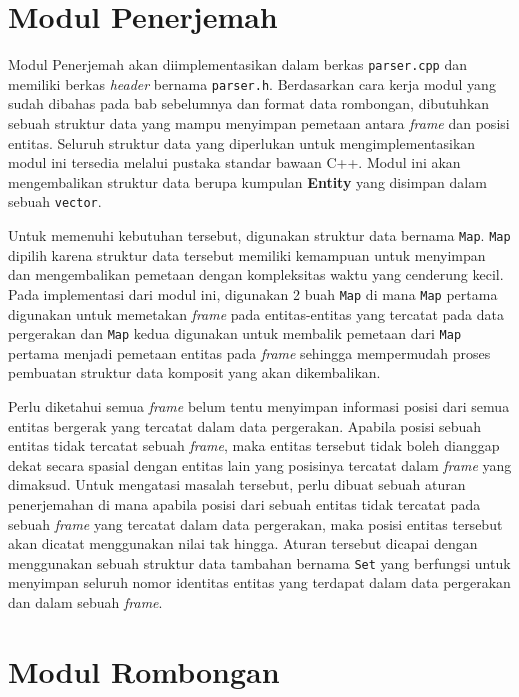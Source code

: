 \section{Modul Penerjemah}
\label{sec:impl-parser}

Modul Penerjemah akan diimplementasikan dalam berkas \texttt{parser.cpp} dan memiliki berkas \textit{header} bernama \texttt{parser.h}. Berdasarkan cara kerja modul yang sudah dibahas pada bab sebelumnya dan format data rombongan, dibutuhkan sebuah struktur data yang mampu menyimpan pemetaan antara \textit{frame} dan posisi entitas. Seluruh struktur data yang diperlukan untuk mengimplementasikan modul ini tersedia melalui pustaka standar bawaan C++. Modul ini akan mengembalikan struktur data berupa kumpulan \textbf{Entity} yang disimpan dalam sebuah \texttt{vector}.

Untuk memenuhi kebutuhan tersebut, digunakan struktur data bernama \texttt{Map}. \texttt{Map} dipilih karena struktur data tersebut memiliki kemampuan untuk menyimpan dan mengembalikan pemetaan dengan kompleksitas waktu yang cenderung kecil. Pada implementasi dari modul ini, digunakan 2 buah \texttt{Map} di mana \texttt{Map} pertama digunakan untuk memetakan \textit{frame} pada entitas-entitas yang tercatat pada data pergerakan dan \texttt{Map} kedua digunakan untuk membalik pemetaan dari \texttt{Map} pertama menjadi pemetaan entitas pada \textit{frame} sehingga mempermudah proses pembuatan struktur data komposit yang akan dikembalikan. 

Perlu diketahui semua \textit{frame} belum tentu menyimpan informasi posisi dari semua entitas bergerak yang tercatat dalam data pergerakan. Apabila posisi sebuah entitas tidak tercatat sebuah \textit{frame}, maka entitas tersebut tidak boleh dianggap dekat secara spasial dengan entitas lain yang posisinya tercatat dalam \textit{frame} yang dimaksud. Untuk mengatasi masalah tersebut, perlu dibuat sebuah aturan penerjemahan di mana apabila posisi dari sebuah entitas tidak tercatat pada sebuah \textit{frame} yang tercatat dalam data pergerakan, maka posisi entitas tersebut akan dicatat menggunakan nilai tak hingga. Aturan tersebut dicapai dengan menggunakan sebuah struktur data tambahan bernama \texttt{Set} yang berfungsi untuk menyimpan seluruh nomor identitas entitas yang terdapat dalam data pergerakan dan dalam sebuah \textit{frame}. 

\section{Modul Rombongan}
\label{sec:impl-rombongan}

